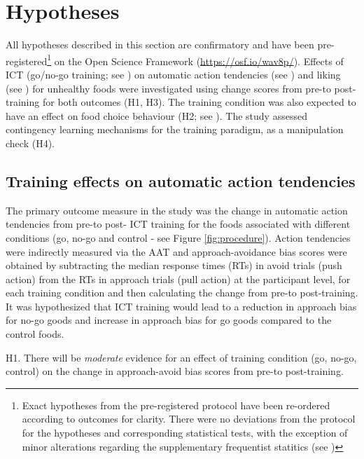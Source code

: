 \documentclass[man,floatsintext]{apa6}
\let\rmarkdownfootnote\footnote%
\def\footnote{\protect\rmarkdownfootnote}
\begin{document}
\hypertarget{hypotheses}{%
\section{Hypotheses}\label{hypotheses}}

All hypotheses described in this section are confirmatory and have been pre-registered\footnote{Exact hypotheses from the pre-registered protocol have been re-ordered according to outcomes for clarity. There were no deviations from the protocol for the hypotheses and corresponding statistical tests, with the exception of minor alterations regarding the supplementary frequentist statitics (see \textit{})} on the Open Science Framework (\url{https://osf.io/wav8p/}). Effects of ICT (go/no-go training; see \textit{}) on automatic action tendencies (see \textit{}) and liking (see \textit{}) for unhealthy foods were investigated using change scores from pre-to post-training for both outcomes (H1, H3). The training condition was also expected to have an effect on food choice behaviour (H2; see \textit{}). The study assessed contingency learning mechanisms for the training paradigm, as a manipulation check (H4).

\hypertarget{training-effects-on-automatic-action-tendencies}{%
\subsection{Training effects on automatic action tendencies}\label{training-effects-on-automatic-action-tendencies}}

The primary outcome measure in the study was the change in automatic action tendencies from pre-to post- ICT training for the foods associated with different conditions (go, no-go and control - see Figure \ref{fig:procedure}). Action tendencies were indirectly measured via the AAT and approach-avoidance bias scores were obtained by subtracting the median response times (RTs) in avoid trials (push action) from the RTs in approach trials (pull action) at the participant level, for each training condition and then calculating the change from pre-to post-training. It was hypothesized that ICT training would lead to a reduction in approach bias for no-go goods and increase in approach bias for go goods compared to the control foods.

\noindent H1. There will be \emph{moderate} evidence for an effect of training condition (go, no-go, control) on the change in approach-avoid bias scores from pre-to post-training.
\end{document}

